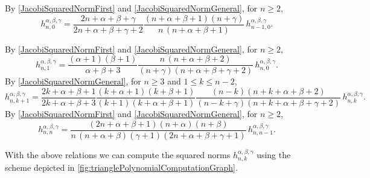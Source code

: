 \documentclass{article}
\numberwithin{equation}{section}
\numberwithin{figure}{section}
\begin{document}
By \eqref{JacobiSquaredNormFirst} and \eqref{JacobiSquaredNormGeneral}, for $n \geq 2$,
%
\begin{equation}\label{hn0}
h^{\alpha,\beta,\gamma}_{n,0} = \frac{2n+\alpha+\beta+\gamma}{2n+\alpha+\beta+\gamma+2} \frac{(n+\alpha+\beta+1)(n+\gamma)}{n \, (n+\alpha+\beta+1)} \, h^{\alpha,\beta,\gamma}_{n-1,0}.
\end{equation}
%

By \eqref{JacobiSquaredNormFirst} and \eqref{JacobiSquaredNormGeneral}, for $n \geq 2$,
%
\begin{equation}\label{hn1}
h^{\alpha,\beta,\gamma}_{n,1} = \frac{(\alpha+1)(\beta+1)}{\alpha+\beta+3} \frac{n \, (n+\alpha+\beta+2)}{(n+\gamma)(n+\alpha+\beta+\gamma+2)} \, h^{\alpha,\beta,\gamma}_{n,0}.
\end{equation}
%
By \eqref{JacobiSquaredNormGeneral}, for $n \geq 3$ and $1 \leq k \leq n-2$,
%
\begin{equation}\label{hnkp1}
h^{\alpha,\beta,\gamma}_{n,k+1} = \frac{2k+\alpha+\beta+1}{2k+\alpha+\beta+3} \frac{(k+\alpha+1)(k+\beta+1)}{(k+1)(k+\alpha+\beta+1)} \frac{(n-k)(n+k+\alpha+\beta+2)}{(n-k+\gamma)(n+k+\alpha+\beta+\gamma+2)} \, h^{\alpha,\beta,\gamma}_{n,k}.
\end{equation}
%
By \eqref{JacobiSquaredNormFirst} and \eqref{JacobiSquaredNormGeneral}, for $n \geq 2$,
%
\begin{equation}\label{hnn}
h^{\alpha,\beta,\gamma}_{n,n} = \frac{(2n+\alpha+\beta+1)(n+\alpha)(n+\beta)}{n\,(n+\alpha+\beta)(\gamma+1)(2n+\alpha+\beta+\gamma+1)} \, h^{\alpha,\beta,\gamma}_{n,n-1}.
\end{equation}
%

With the above relations we can compute the squared norms $h^{\alpha,\beta,\gamma}_{n,k}$ using the scheme depicted in \autoref{fig:trianglePolynomialComputationGraph}.
\end{document}

